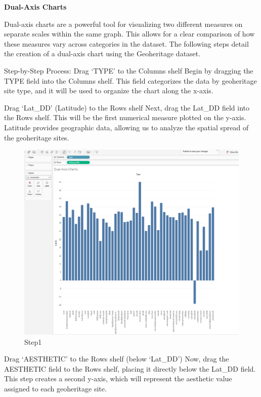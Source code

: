 \documentclass[
  letterpaper,
  DIV=11,
  numbers=noendperiod]{scrreprt}
\begin{document}
\textbf{Dual-Axis Charts}

Dual-axis charts are a powerful tool for visualizing two different
measures on separate scales within the same graph. This allows for a
clear comparison of how these measures vary across categories in the
dataset. The following steps detail the creation of a dual-axis chart
using the Geoheritage dataset.

Step-by-Step Process: Drag `TYPE' to the Columns shelf Begin by dragging
the TYPE field into the Columns shelf. This field categorizes the data
by geoheritage site type, and it will be used to organize the chart
along the x-axis.

Drag `Lat\_DD' (Latitude) to the Rows shelf Next, drag the Lat\_DD field
into the Rows shelf. This will be the first numerical measure plotted on
the y-axis. Latitude provides geographic data, allowing us to analyze
the spatial spread of the geoheritage sites.

\begin{figure}[H]

{\centering \includegraphics{Step1_DAC.png}

}

\caption{Step1}

\end{figure}%

Drag `AESTHETIC' to the Rows shelf (below `Lat\_DD') Now, drag the
AESTHETIC field to the Rows shelf, placing it directly below the Lat\_DD
field. This step creates a second y-axis, which will represent the
aesthetic value assigned to each geoheritage site.
\end{document}
